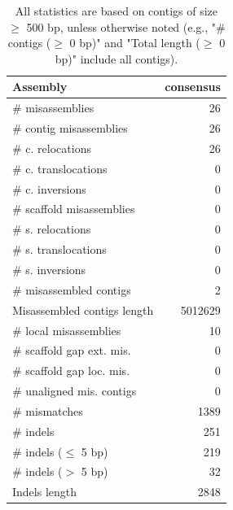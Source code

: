 \documentclass[12pt,a4paper]{article}
\begin{document}
\begin{table}[ht]
\begin{center}
\caption{All statistics are based on contigs of size $\geq$ 500 bp, unless otherwise noted (e.g., "\# contigs ($\geq$ 0 bp)" and "Total length ($\geq$ 0 bp)" include all contigs).}
\begin{tabular}{|l*{1}{|r}|}
\hline
Assembly & consensus \\ \hline
\# misassemblies & 26 \\ \hline
\hspace{2mm}\# contig misassemblies & 26 \\ \hline
\hspace{5mm}\# c. relocations & 26 \\ \hline
\hspace{5mm}\# c. translocations & 0 \\ \hline
\hspace{5mm}\# c. inversions & 0 \\ \hline
\hspace{2mm}\# scaffold misassemblies & 0 \\ \hline
\hspace{5mm}\# s. relocations & 0 \\ \hline
\hspace{5mm}\# s. translocations & 0 \\ \hline
\hspace{5mm}\# s. inversions & 0 \\ \hline
\# misassembled contigs & 2 \\ \hline
Misassembled contigs length & 5012629 \\ \hline
\# local misassemblies & 10 \\ \hline
\# scaffold gap ext. mis. & 0 \\ \hline
\# scaffold gap loc. mis. & 0 \\ \hline
\# unaligned mis. contigs & 0 \\ \hline
\# mismatches & 1389 \\ \hline
\# indels & 251 \\ \hline
\hspace{5mm}\# indels ($\leq$ 5 bp) & 219 \\ \hline
\hspace{5mm}\# indels ($>$ 5 bp) & 32 \\ \hline
Indels length & 2848 \\ \hline
\end{tabular}
\end{center}
\end{table}
\end{document}
